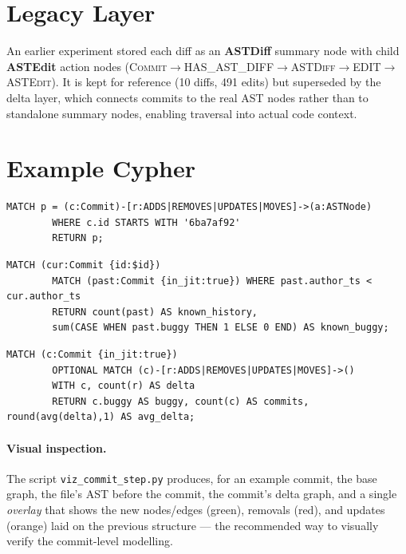 \documentclass[11pt,a4paper]{article}
\newcommand{\node}[1]{\textcolor{kgblue}{\textbf{#1}}}
\newcommand{\edge}[1]{\textsc{#1}}
\begin{document}
	\section{Legacy Layer}\label{sec:legacy}
	An earlier experiment stored each diff as an \node{ASTDiff} summary node with
	child \node{ASTEdit} action nodes
	(\edge{Commit}$\rightarrow$\edge{HAS\_AST\_DIFF}$\rightarrow$\edge{ASTDiff}$\rightarrow$\edge{EDIT}$\rightarrow$\edge{ASTEdit}).
	It is kept for reference (10 diffs, 491 edits) but superseded by the delta layer,
	which connects commits to the real AST nodes rather than to standalone summary
	nodes, enabling traversal into actual code context.
	
	\appendix
	\section{Example Cypher}
	\begin{lstlisting}[style=cypher,caption={A commit's delta graph (Graph view).}]
		MATCH p = (c:Commit)-[r:ADDS|REMOVES|UPDATES|MOVES]->(a:ASTNode)
		WHERE c.id STARTS WITH '6ba7af92'
		RETURN p;
	\end{lstlisting}
	
	\begin{lstlisting}[style=cypher,caption={Online evaluation window: history known when a commit arrives.}]
		MATCH (cur:Commit {id:$id})
		MATCH (past:Commit {in_jit:true}) WHERE past.author_ts < cur.author_ts
		RETURN count(past) AS known_history,
		sum(CASE WHEN past.buggy THEN 1 ELSE 0 END) AS known_buggy;
	\end{lstlisting}
	
	\begin{lstlisting}[style=cypher,caption={Average AST-delta size: buggy vs.\ benign.}]
		MATCH (c:Commit {in_jit:true})
		OPTIONAL MATCH (c)-[r:ADDS|REMOVES|UPDATES|MOVES]->()
		WITH c, count(r) AS delta
		RETURN c.buggy AS buggy, count(c) AS commits, round(avg(delta),1) AS avg_delta;
	\end{lstlisting}
	
	\paragraph{Visual inspection.} The script
	\texttt{viz\_commit\_step.py} produces, for an example commit, the base graph,
	the file's AST before the commit, the commit's delta graph, and a single
	\emph{overlay} that shows the new nodes/edges (green), removals (red), and
	updates (orange) laid on the previous structure --- the recommended way to
	visually verify the commit-level modelling.
\end{document}
